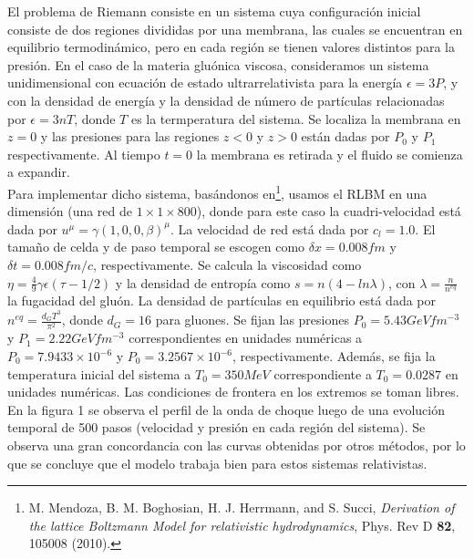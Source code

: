 \documentclass{article}
\begin{document}
El problema de Riemann consiste en un sistema cuya configuración inicial consiste de dos regiones divididas por una membrana, las cuales se encuentran en equilibrio termodinámico, pero en cada región se tienen valores distintos para la presión. En el caso de la materia gluónica viscosa, consideramos un sistema unidimensional con ecuación de estado ultrarrelativista para la energía $\epsilon = 3P$, y con la densidad de energía y la densidad de número de partículas relacionadas por $\epsilon=3nT$, donde $T$ es la termperatura del sistema. Se localiza la membrana en $z=0$ y las presiones para las regiones $z<0$ y $z>0$ están dadas por $P_0$ y $P_1$ respectivamente. Al tiempo $t=0$ la membrana es retirada y el fluido se comienza a expandir.\\

Para implementar dicho sistema, basándonos en\footnote{M. Mendoza, B. M. Boghosian, H. J. Herrmann, and S. Succi, \textit{Derivation of the lattice Boltzmann Model for relativistic hydrodynamics}, Phys. Rev D \textbf{82}, 105008 (2010).}, usamos el RLBM en una dimensión (una red de $1\times1\times800$), donde para este caso la cuadri-velocidad está dada por $u^{\mu}=\gamma(1,0,0,\beta)^{\mu}$. La velocidad de red está dada por $c_l=1.0$. El tamaño de celda y de paso temporal se escogen como $\delta x = 0.008 fm$ y $\delta t = 0.008 fm/c$, respectivamente. Se calcula la viscosidad como $\eta=\frac{4}{9}\gamma \epsilon(\tau-1/2) $ y la densidad de entropía como $s= n(4-ln\lambda)$, con $\lambda=\frac{n}{n^{eq}}$ la fugacidad del gluón. La densidad de partículas en equilibrio está dada por $n^{eq}=\frac{d_G T^3}{\pi^2}$, donde $d_G=16$ para gluones. Se fijan las presiones $P_0=5.43 GeVfm^{-3}$ y $P_1=2.22 GeVfm^{-3}$ correspondientes en unidades numéricas a $P_0=7.9433\times 10^{-6}$ y $P_0=3.2567\times 10^{-6}$, respectivamente. Además, se fija la temperatura inicial del sistema a $T_0=350MeV$ correspondiente a $T_0=0.0287$ en unidades numéricas. Las condiciones de frontera en los extremos se toman libres.\\

En la figura 1 se observa el perfil de la onda de choque luego de una evolución temporal de 500 pasos (velocidad y presión en cada región del sistema). Se observa una gran concordancia con las curvas obtenidas por otros métodos, por lo que se concluye que el modelo trabaja bien para estos sistemas relativistas.
\end{document}
